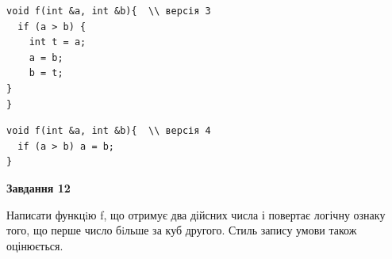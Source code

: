 \documentclass[12pt, ukrainian]{article}
\begin{document}
{\begin {large}
\begin{minipage}[t]{11.0cm}
\vspace{-8mm}\begin{verbatim}
void f(int &a, int &b){  \\ версія 3
  if (a > b) {
    int t = a;
    a = b;
    b = t;
}  
}
\end{verbatim}

\vspace{-8mm}\begin{verbatim}
void f(int &a, int &b){  \\ версія 4
  if (a > b) a = b;
}
\end{verbatim}



\begin{center}
\textbf{Завдання 12}
\end{center}

Написати функцiю f, що отримує два дійсних числа і повертає логічну ознаку того, що перше число бiльше за куб другого. Стиль запису умови також оцінюється.\par

\end{minipage}

\end {large}}
\newpage
\end{document}
